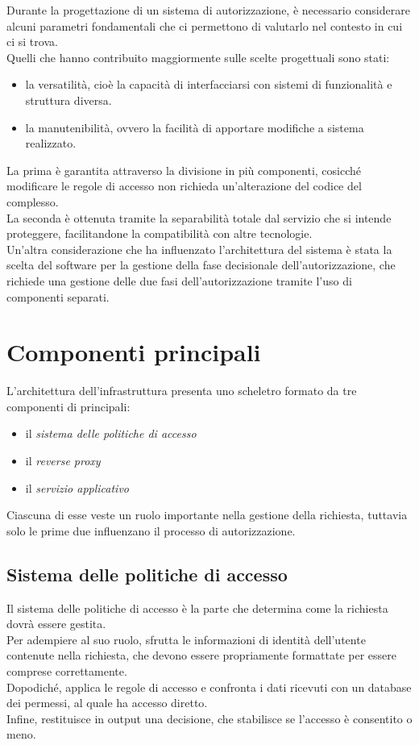 Durante la progettazione di un sistema di autorizzazione, è necessario considerare alcuni parametri fondamentali
 che ci permettono di valutarlo 
nel contesto in cui ci si trova.
\\ Quelli che hanno contribuito maggiormente sulle scelte progettuali sono stati:
\begin{itemize}
    \item la versatilità, cioè la capacità di interfacciarsi con sistemi di 
    funzionalità e struttura diversa.
    \item la manutenibilità, ovvero la facilità di apportare modifiche a sistema realizzato.
\end{itemize}
La prima è garantita attraverso la divisione in più componenti, cosicché modificare le regole di accesso non richieda
un'alterazione del codice del complesso. 
\\ La seconda è ottenuta tramite la separabilità totale dal servizio che si intende proteggere,
 facilitandone la compatibilità con altre tecnologie.  
\\ Un'altra considerazione che ha influenzato l'architettura del sistema è stata la scelta del software per la gestione 
della fase decisionale dell'autorizzazione, che richiede una gestione delle due fasi dell'autorizzazione tramite l'uso di componenti separati. 

\section{Componenti principali}

L'architettura dell'infrastruttura presenta uno scheletro formato da tre componenti di principali: 
\begin{itemize}
    \item il \textit{sistema delle politiche di accesso}
    \item il \textit{reverse proxy}
    \item il \textit{servizio applicativo}
\end{itemize}
Ciascuna di esse veste un ruolo importante nella gestione della richiesta, tuttavia solo le prime due influenzano il processo di autorizzazione. 

\subsection{Sistema delle politiche di accesso}
Il sistema delle politiche di accesso è la parte che determina come la richiesta dovrà essere gestita. 
\\ Per adempiere al suo ruolo, sfrutta le informazioni di identità dell'utente contenute nella richiesta, 
che devono essere propriamente formattate per essere comprese correttamente. 
\\ Dopodiché, applica le regole di accesso e confronta i dati ricevuti con un database dei permessi, al quale ha accesso diretto.
\\ Infine, restituisce in output una decisione, che stabilisce se l'accesso è consentito o meno.  

